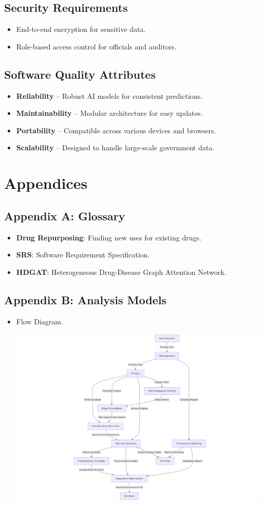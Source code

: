 \documentclass{article}
\begin{document}
\subsection{Security Requirements}
\begin{itemize}
    \item End-to-end encryption for sensitive data.
    \item Role-based access control for officials and auditors.
\end{itemize}

\subsection{Software Quality Attributes}
\begin{itemize}
    \item \textbf{Reliability} – Robust AI models for consistent predictions.
    \item \textbf{Maintainability} – Modular architecture for easy updates.
    \item \textbf{Portability} – Compatible across various devices and browsers.
    \item \textbf{Scalability} – Designed to handle large-scale government data.
\end{itemize}

\newpage
\section{Appendices}
\subsection{Appendix A: Glossary}
\begin{itemize}
    \item \textbf{Drug Repurposing}: Finding new uses for existing drugs.
    \item \textbf{SRS}: Software Requirement Specification.
    \item \textbf{HDGAT}: Heterogeneous Drug-Disease Graph Attention Network.
\end{itemize}

\subsection{Appendix B: Analysis Models}
\begin{itemize}
    \item Flow Diagram.


    \centering
    \includegraphics[width=1\linewidth]{mermaid-diagram-2025-02-13-134150.png}
    \label{fig:enter-label}
\end{itemize}
\end{document}
